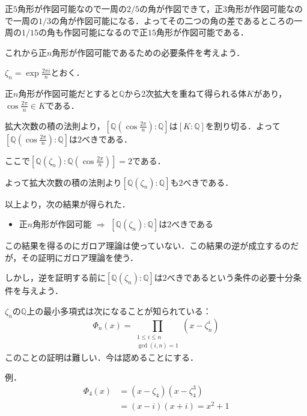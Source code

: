 \documentclass[dvipdfmx,17pt]{beamer}
\theoremstyle{plain}
\newcommand{\Q}{\mathbb{Q}}
\begin{document}
\begin{frame}
正$5$角形が作図可能なので一周の$2/5$の角が作図できて，正$3$角形が作図可能なので一周の$1/3$の角が作図可能になる．よってその二つの角の差であるところの一周の$1/15$の角も作図可能になるので正$15$角形が作図可能である．

\end{frame}

\begin{frame}
これから正$n$角形が作図可能であるための必要条件を考えよう．

$\zeta_n = \exp \frac{2 \pi i}{n}$とおく．

正$n$角形が作図可能だとすると$\Q$から$2$次拡大を重ねて得られる体$K$があり，$\cos \frac{2 \pi}{n} \in K$である．

拡大次数の積の法則より，$[\Q(\cos \frac{2 \pi}{n}) : \Q]$は$[K : \Q]$を割り切る．よって$[\Q(\cos \frac{2 \pi}{n}) : \Q]$は$2$べきである．

\end{frame}

\begin{frame}
ここで$[\Q(\zeta_n) : \Q(\cos \frac{2 \pi}{n})] = 2$である．

よって拡大次数の積の法則より$[\Q(\zeta_n) : \Q]$も$2$べきである．
\end{frame}

\begin{frame}
以上より，次の結果が得られた．

\begin{itemize}
\item 正$n$角形が作図可能 $\Rightarrow$ $[\Q(\zeta_n) : \Q]$は$2$べきである
\end{itemize}

この結果を得るのにガロア理論は使っていない．この結果の逆が成立するのだが，その証明にガロア理論を使う．

しかし，逆を証明する前に$[\Q(\zeta_n) : \Q]$は$2$べきであるという条件の必要十分条件を与えよう．
\end{frame}

\begin{frame}
$\zeta_n$の$\Q$上の最小多項式は次になることが知られている：
\[ \Phi_n(x) = \prod_{\substack{1 \le i \le n \\ \gcd(i, n) = 1}} (x - \zeta_n^i) \]
このことの証明は難しい．今は認めることにする．
\end{frame}

\begin{frame}
例．
\begin{align*}
\Phi_4(x) &= (x - \zeta_4)(x - \zeta_4^3) \\
&= (x - i)(x + i) = x^2 + 1
\end{align*}
\end{frame}
\end{document}
